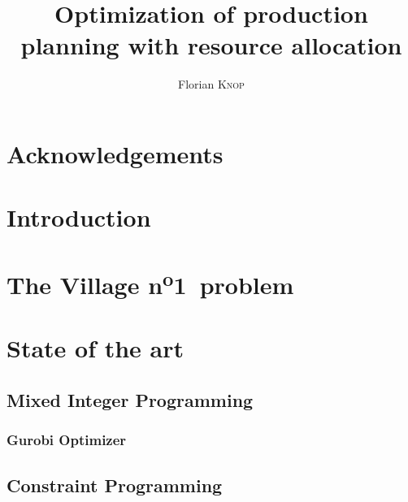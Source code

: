 \documentclass{template/EPL-master-thesis-covers-EN}
\title{Optimization of production planning with resource allocation}
\author{Florian \textsc{Knop}}
\begin{document}
  \def\chapterautorefname{Chapter}
  \def\sectionautorefname{Section}
  \newcommand{\vone}{Village n\textsuperscript{o}1}

  
  \maketitle

  \thispagestyle{plain}


  \begin{abstract}
    \normalsize
    \lipsum[1]
  \end{abstract}


  \chapter*{Acknowledgements}

  \lipsum[1]

  \tableofcontents




  \chapter{Introduction}
  \label{chapter:introduction}
  

  \chapter{The \vone\ problem}
  \label{chapter:problem}
  


  \chapter{State of the art}
  \label{chapter:sota}

  \section{Mixed Integer Programming}
  

  \subsection{Gurobi Optimizer}
  \label{subsection:gurobi}
  

  \section{Constraint Programming}
  
\end{document}
